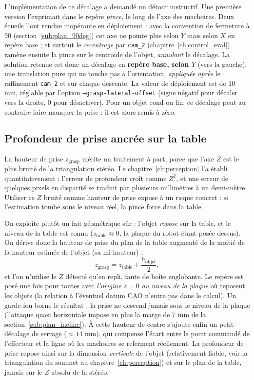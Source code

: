 L'implémentation de ce décalage a demandé un détour instructif. Une première
version l'exprimait dans le repère \emph{pince}, le long de l'axe des machoires.
Deux écueils l'ont rendue inopérante en déploiement : avec la convention de
fermeture à \(90\)\textdegree{} (section~\ref{sub:plan_90deg}) cet axe ne pointe
plus selon \(Y\) mais selon \(X\) en repère base ; et surtout le \emph{recentrage}
par \texttt{cam\_2} (chapitre~\ref{ch:control_eval}) ramène ensuite la pince sur le
centroïde de l'objet, \emph{annulant} le décalage. La solution retenue est donc un
décalage en \textbf{repère base, selon \(Y\)} (vers la gauche), une translation
pure qui ne touche pas à l'orientation, \emph{appliquée après} le raffinement
\texttt{cam\_2} et sur chaque descente. La valeur de déploiement est de
\(10\) mm, réglable par l'option \texttt{--grasp-lateral-offset} (signe négatif
pour décaler vers la droite, \(0\) pour désactiver). Pour un objet rond ou fin,
ce décalage peut au contraire faire manquer la prise : il est alors remis à zéro.

\subsection{Profondeur de prise ancrée sur la table}
\label{sub:plan_depth}

La hauteur de prise \(z_{\text{grasp}}\) mérite un traitement à part, parce que
l'axe \(Z\) est le plus bruité de la triangulation stéréo. Le
chapitre~\ref{ch:perception} l'a établi quantitativement : l'erreur de profondeur
croît comme \(Z^2\), et une erreur de quelques pixels en disparité se traduit par
plusieurs millimètres à un demi-mètre. Utiliser ce \(Z\) bruité comme hauteur de
prise expose à un risque concret : si l'estimation tombe sous le niveau réel, la
pince force dans la table.

On exploite plutôt un fait géométrique sûr : l'objet \emph{repose} sur la table,
et le niveau de la table est connu (\(z_{\text{table}} \approx 0\), la plaque du
robot étant posée dessus). On dérive donc la hauteur de prise du plan de la table
augmenté de la moitié de la hauteur estimée de l'objet (sa mi-hauteur) :
\begin{equation}
  z_{\text{grasp}} = z_{\text{table}} + \frac{h_{\text{objet}}}{2} ,
\end{equation}
et l'on n'utilise le \(Z\) détecté qu'en repli, faute de boîte englobante. Le
repère est posé une fois pour toutes avec \emph{l'origine \(z = 0\) au niveau de
la plaque} où reposent les objets (la relation à l'éventuel datum CAO n'entre pas
dans le calcul). Un garde-fou borne le résultat : la prise ne descend jamais sous
le niveau de la plaque (l'attaque quasi horizontale impose en plus la marge de
\(7\) mm de la section~\ref{sub:plan_incline}). À cette hauteur de centre s'ajoute
enfin un petit décalage de serrage (\(\approx 14\) mm), qui compense l'écart entre
le point commandé de l'effecteur et la ligne où les machoires se referment
réellement. La profondeur de prise repose ainsi sur la dimension \emph{verticale}
de l'objet (relativement fiable, voir la triangulation du sommet au
chapitre~\ref{ch:perception}) et sur le plan de la table, jamais sur le \(Z\)
absolu de la stéréo.

